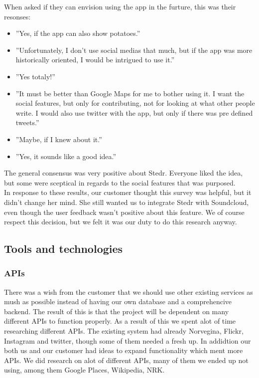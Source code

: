 	When asked if they can envision using the app in the furture, this was their resonses:
\begin{itemize}
	\item ”Yes, if the app can also show potatoes.”
	\item ”Unfortunately, I don't use social medias that much, but if the app was more historically oriented, I would be intrigued to use it.”
	\item ”Yes totaly!”
	\item ”It must be better than Google Maps for me to bother using it. I want the social features, but only for contributing, not for looking at what other people write. I would also use twitter with the app, but only if there was pre defined tweets.”
	\item”Maybe, if I knew about it.”
	\item ”Yes, it sounds like a good idea.”
\end{itemize}

	The general consensus was very positive about Stedr. Everyone liked the idea, but some were sceptical in regards to the social features that was purposed.\\

	In response to these results, our customer thought this survey was helpful, but it didn't change her mind. She still wanted us to integrate Stedr with Soundcloud, even though the user feedback wasn't positive about this feature. We of course respect this decision, but we felt it was our duty to do this research anyway.
	
	\subsection{Tools and technologies}
	
		\subsubsection{APIs}
		
		There was a wish from the customer that we should use other existing services as mush as possible instead of having our own database and a comprehencive backend. The result of this is that the project will be dependent on many different APIs to function properly. As a result of this we spent alot of time researching different APIs. The existing system had already Norvegina, Flickr, Instagram and twitter, though some of them needed a fresh up. In addidtion our both us and our customer had ideas to expand functionality which ment more APIs. We did research on alot of different APIs, many of them we ended up not using, among them Google Places, Wikipedia, NRK. 
		
